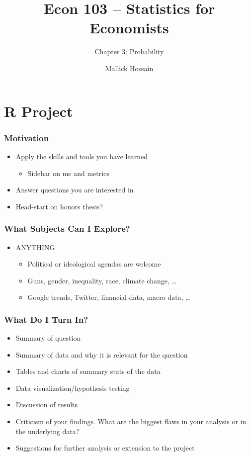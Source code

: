 \documentclass{beamer}
\title{Econ 103 -- Statistics for Economists}
\subtitle{Chapter 3: Probability}
\author{Mallick Hossain}
\date{}
\institute{University of Pennsylvania}
\begin{document}
 

\begin{frame}
	\titlepage 
\end{frame} 

\section{R Project}
\begin{frame}
\frametitle{Motivation}
    \begin{itemize}[<+- | alert@+>]
        \item Apply the skills and tools you have learned
        \begin{itemize}
        		\item Sidebar on me and metrics
        \end{itemize}
        \item Answer questions you are interested in
        \item Head-start on honors thesis?
    \end{itemize}
\end{frame}

\begin{frame}
\frametitle{What Subjects Can I Explore?}
    \begin{itemize}[<+- | alert@+>]
        \item ANYTHING
        \begin{itemize}
        		\item Political or ideological agendas are welcome
        		\item Guns, gender, inequality, race, climate change, \ldots
        		\item Google trends, Twitter, financial data, macro data, \ldots
        \end{itemize}
    \end{itemize}
\end{frame}

\begin{frame}
\frametitle{What Do I Turn In?}
    \begin{itemize}[<+- | alert@+>]
        	\item Summary of question
		\item Summary of data and why it is relevant for the question			
		\item Tables and charts of summary stats of the data
		\item Data visualization/hypothesis testing
		\item Discussion of results
		\item Criticism of your findings. What are the biggest flaws in your analysis or in the underlying data?
		\item Suggestions for further analysis or extension to the project
    \end{itemize}
\end{frame}
\end{document}
